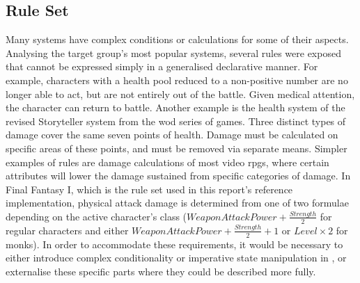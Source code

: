 \subsection{\langname{} Rule Set}
\label{language:ruleset}
Many systems have complex conditions or calculations for some of their aspects. Analysing the target group's most popular systems, several rules were exposed that cannot be expressed simply in a generalised declarative manner. For example, characters with a health pool reduced to a non-positive number are no longer able to act, but are not entirely out of the battle. Given medical attention, the character can return to battle.
Another example is the health system of the revised Storyteller system from the \ac{wod} series of games. Three distinct types of damage cover the same seven points of health. Damage must be calculated on specific areas of these points, and must be removed via separate means.
Simpler examples of rules are damage calculations of most video \ac{rpgs}, where certain attributes will lower the damage sustained from specific categories of damage. In Final Fantasy I, which is the rule set used in this report's reference implementation, physical attack damage is determined from one of two formulae depending on the active character's class ($WeaponAttackPower + \frac{Strength}{2}$ for regular characters and either $WeaponAttackPower + \frac{Strength}{2} + 1$ or $Level \times 2$ for monks).
In order to accommodate these requirements, it would be necessary to either introduce complex conditionality or imperative state manipulation in \langname{}, or externalise these specific parts where they could be described more fully.

